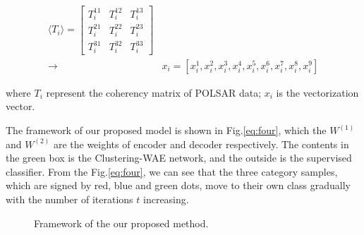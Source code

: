 \documentclass[11pt, a4paper, onecolumn, oneside]{article}
\begin{document}
\begin{equation} \label{eq:four}
\begin{split}
\langle T_i\rangle =\left[{ {\begin{array}{*{20}{c}} {T_{i}^{11}}& {T_{i}^{12}}& {T_{i}^{13}}\\ {T_{i}^{21}}& {T_{i}^{22}}& {T_{i}^{23}}\\ {T_{i}^{31}}& {T_{i}^{32}}& {T_{i}^{33}} \end{array}} }\right] \\
\to&{x_{i}} = \left [{ {x_{i}^{1},x_{i}^{2},x_{i}^{3},x_{i}^{4},x_{i}^{5},x_{i}^{6},x_{i}^{7},x_{i}^{8},x_{i}^{9}} }\right ]
\end{split}
\end{equation}

where $T_i$ represent the coherency matrix of POLSAR data; $x_i$ is the vectorization vector.

The framework of our proposed model is shown in Fig.\ref{eq:four}, which the $W^{(1)}$ and $W^{(2)}$ are the weights of encoder and decoder respectively. The contents in the green box is the Clustering-WAE network, and the outside is the supervised classifier. From the Fig.\ref{eq:four}, we can see that the three category samples, which are signed by red, blue and green dots, move to their own class gradually with the number of iterations $t$ increasing.

\begin{figure}
\centering
{}
\caption{Framework of the our proposed method.}
\label{fig:three}
\end{figure}
\end{document}
